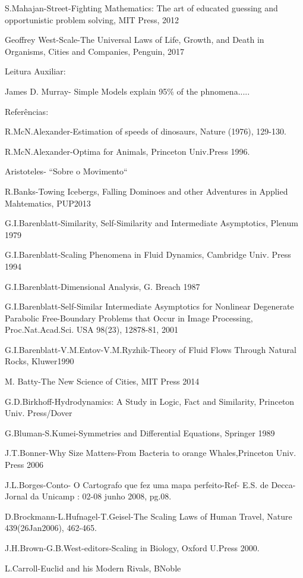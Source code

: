 S.Mahajan-Street-Fighting Mathematics: The art of educated guessing and opportunistic problem solving, MIT Press, 2012

Geoffrey West-Scale-The Universal Laws of Life, Growth, and Death in Organisms, Cities and Companies, Penguin, 2017

Leitura Auxiliar:

James D. Murray- Simple Models explain 95\% of the phnomena.....

Referências:

R.McN.Alexander-Estimation of speeds of dinosaurs, Nature (1976), 129-130.

R.McN.Alexander-Optima for Animals, Princeton Univ.Press 1996.

Aristoteles- ``Sobre o Movimento``

R.Banks-Towing Icebergs, Falling Dominoes and other Adventures in Applied Mahtematics, PUP2013

G.I.Barenblatt-Similarity, Self-Similarity and Intermediate Asymptotics, Plenum 1979

G.I.Barenblatt-Scaling Phenomena in Fluid Dynamics, Cambridge Univ. Press 1994

G.I.Barenblatt-Dimensional Analysis, G. Breach 1987

G.I.Barenblatt-Self-Similar Intermediate Asymptotics for Nonlinear Degenerate Parabolic Free-Boundary Problems that Occur in Image Processing, Proc.Nat.Acad.Sci. USA 98(23), 12878-81, 2001

G.I.Barenblatt-V.M.Entov-V.M.Ryzhik-Theory of Fluid Flows Through Natural Rocks, Kluwer1990

M. Batty-The New Science of Cities, MIT Press 2014

G.D.Birkhoff-Hydrodynamics: A Study in Logic, Fact and Similarity, Princeton Univ. Press/Dover

G.Bluman-S.Kumei-Symmetries and Differential Equations, Springer 1989

J.T.Bonner-Why Size Matters-From Bacteria to orange Whales,Princeton Univ. Press 2006

J.L.Borges-Conto- O Cartografo que fez uma mapa perfeito-Ref- E.S. de Decca-Jornal da Unicamp : 02-08 junho
2008, pg.08.

D.Brockmann-L.Hufnagel-T.Geisel-The Scaling Laws of Human Travel, Nature 439(26Jan2006), 462-465.

J.H.Brown-G.B.West-editors-Scaling in Biology, Oxford U.Press 2000.

L.Carroll-Euclid and his Modern Rivals, BNoble


